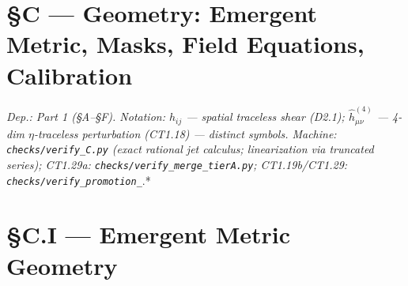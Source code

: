 \section[§C — Geometry: Emergent Metric, Masks, Field Equations,…]{\texorpdfstring{§C — Geometry: Emergent Metric, Masks, Field Equations, Calibration}{SC - Geometry: Emergent Metric, Masks, Field Equations, Calibration}}

\textit{Dep.: Part 1 (§A–§F). Notation: $\hat h_{ij}$ — spatial traceless shear (D2.1); $\hat h^{(4)}_{\mu\nu}$ — 4-dim $\eta$-traceless perturbation (CT1.18) — distinct symbols. Machine: \texttt{checks/\allowbreak{}verify\_\allowbreak{}C.py} (exact rational jet calculus; linearization via truncated series); CT1.29a: \texttt{checks/\allowbreak{}verify\_\allowbreak{}merge\_\allowbreak{}tierA.py}; CT1.19b/CT1.29: \texttt{checks/\allowbreak{}verify\_\allowbreak{}promotion\_\allowbreak{}}}.*

\section[§C.I — Emergent Metric Geometry]{\texorpdfstring{§C.I — Emergent Metric Geometry}{SC.I - Emergent Metric Geometry}}

